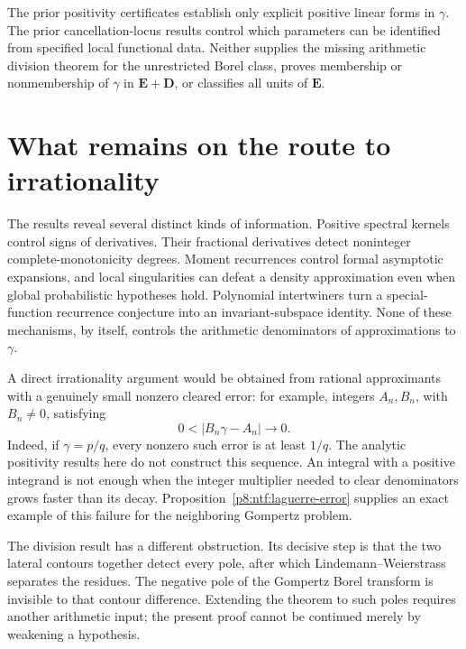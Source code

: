 \documentclass[11pt,a4paper]{article}
\theoremstyle{definition}
\theoremstyle{remark}
\numberwithin{equation}{section}
\begin{document}
The prior positivity certificates establish only explicit positive
linear forms in $\gamma$. The prior cancellation-locus results
control which parameters can be identified from specified local
functional data. Neither supplies the missing arithmetic division
theorem for the unrestricted Borel class, proves membership or
nonmembership of $\gamma$ in $\mathbf E+\mathbf D$, or classifies
all units of $\mathbf E$.


\section{What remains on the route to irrationality}
\label{p8:sec:remaining}
The results reveal several distinct kinds of information. Positive
spectral kernels control signs of derivatives. Their fractional
derivatives detect noninteger complete-monotonicity degrees.
Moment recurrences control formal asymptotic expansions, and local
singularities can defeat a density approximation even when global
probabilistic hypotheses hold. Polynomial intertwiners turn a
special-function recurrence conjecture into an invariant-subspace
identity. None of these mechanisms, by itself, controls the arithmetic
denominators of approximations to $\gamma$.

A direct irrationality argument would be obtained from rational
approximants with a genuinely small nonzero cleared error: for example,
integers $A_n,B_n$, with $B_n\ne0$, satisfying
\[
 0<|B_n\gamma-A_n|\longrightarrow0.
\]
Indeed, if $\gamma=p/q$, every nonzero such error is at least $1/q$.
The analytic positivity results here do not construct this sequence.
An integral with a positive integrand is not enough when the integer
multiplier needed to clear denominators grows faster than its decay.
Proposition~\ref{p8:ntf:laguerre-error} supplies an exact example of this
failure for the neighboring Gompertz problem.

The division result has a different obstruction. Its decisive step is
that the two lateral contours together detect every pole, after which
Lindemann--Weierstrass separates the residues. The negative pole of the
Gompertz Borel transform is invisible to that contour difference.
Extending the theorem to such poles requires another arithmetic input;
the present proof cannot be continued merely by weakening a hypothesis.
\end{document}
